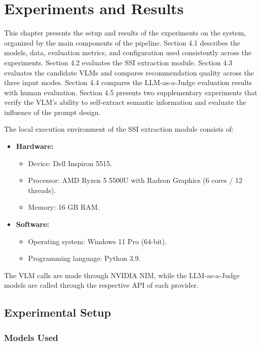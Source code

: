 \documentclass[12pt,a4paper]{report}
\begin{document}
\chapter{Experiments and Results}

This chapter presents the setup and results of the experiments on the system, organized by the main components of the pipeline. Section 4.1 describes the models, data, evaluation metrics, and configuration used consistently across the experiments. Section 4.2 evaluates the SSI extraction module. Section 4.3 evaluates the candidate VLMs and compares recommendation quality across the three input modes. Section 4.4 compares the LLM-as-a-Judge evaluation results with human evaluation. Section 4.5 presents two supplementary experiments that verify the VLM's ability to self-extract semantic information and evaluate the influence of the prompt design.

The local execution environment of the SSI extraction module consists of:

\begin{itemize}
    \item \textbf{Hardware:}
    \begin{itemize}
        \item Device: Dell Inspiron 5515.
        \item Processor: AMD Ryzen 5 5500U with Radeon Graphics (6 cores / 12 threads).
        \item Memory: 16 GB RAM.
    \end{itemize}
    \item \textbf{Software:}
    \begin{itemize}
        \item Operating system: Windows 11 Pro (64-bit).
        \item Programming language: Python 3.9.
    \end{itemize}
\end{itemize}

The VLM calls are made through NVIDIA NIM, while the LLM-as-a-Judge models are called through the respective API of each provider.

\section{Experimental Setup}

\subsection{Models Used}
\end{document}
